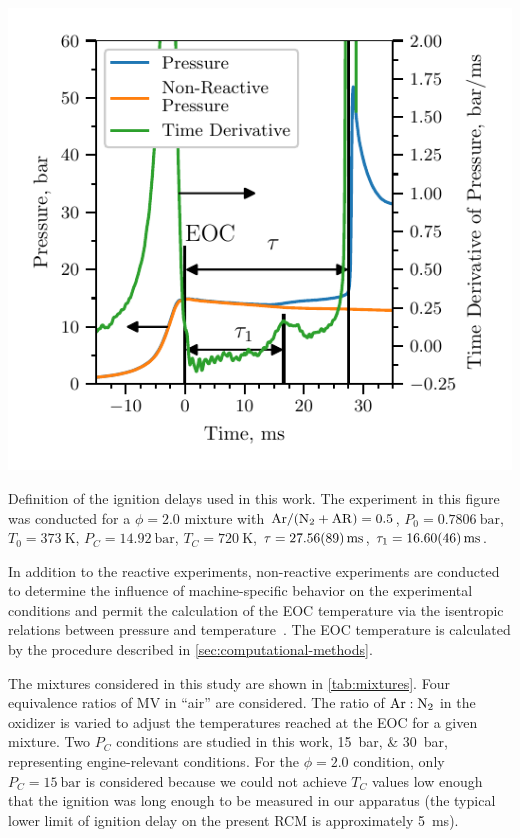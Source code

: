 \documentclass[letterpaper, review]{elsarticle}
\begin{document}
\begin{center}
    \captionsetup{type=figure}
    \includegraphics{figures/ignition_delay_definition.pdf}
    \caption{Definition of the ignition delays used in this work. The
    experiment in this figure was conducted for a \(\phi=2.0\) mixture with
    \mbox{\(\ce{Ar}/(\ce{N2}+\ce{AR})=0.5\)}, \(P_0=\SI{0.7806}{\bar}\),
    \(T_0=\SI{373}{\K}\), \(P_C=\SI{14.92}{\bar}\), \(T_C=\SI{720}{\K}\),
    \(\tau=\SI{27.56\pm0.89}{\ms}\), \(\tau_1=\SI{16.60\pm0.46}{\ms}\).}
    \label{fig:ign-delay-def}
\end{center}

In addition to the reactive experiments, non-reactive experiments are conducted to determine the
influence of machine-specific behavior on the experimental conditions and permit the calculation of
the EOC temperature via the isentropic relations between pressure and temperature~\cite{Lee1998}.
The EOC temperature is calculated by the procedure described in \cref{sec:computational-methods}.

The mixtures considered in this study are shown in \cref{tab:mixtures}. Four equivalence ratios of
MV in ``air'' are considered. The ratio of \(\ce{Ar}:\ce{N2}\) in the oxidizer is varied to adjust
the temperatures reached at the EOC for a given mixture. Two \(P_C\) conditions are studied in this
work, \SIlist{15;30}{\bar}, representing engine-relevant conditions. For the \(\phi=2.0\) condition,
only \(P_C = \SI{15}{\bar}\) is considered because we could not achieve \(T_C\) values low enough
that the ignition was long enough to be measured in our apparatus (the typical lower limit of
ignition delay on the present RCM is approximately \SI{5}{\ms}).
\end{document}
